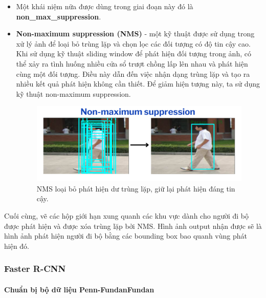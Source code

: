     \begin{itemize}[noitemsep, topsep=0pt, leftmargin=1.5em, label={$-$}]
        \item Một khái niệm nữa được dùng trong giai đoạn này đó là \textbf{non\_max\_suppression}. 
        \item \textbf{Non-maximum suppression (NMS)} - một kỹ thuật được sử dụng trong xử lý ảnh để loại bỏ trùng lặp và chọn lọc các đối tượng có độ tin cậy cao. Khi sử dụng kỹ thuật sliding window để phát hiện đối tượng trong ảnh, có thể xảy ra tình huống nhiều cửa sổ trượt chồng lấp lên nhau và phát hiện cùng một đối tượng. Điều này dẫn đến việc nhận dạng trùng lặp và tạo ra nhiều kết quả phát hiện không cần thiết. Để giảm hiện tượng này, ta sử dụng kỹ thuật non-maximum suppression.
        \graphicspath{{figures/}}
            \begin{figure}[h!]
            \centering
            \includegraphics[scale=0.35]{graphics/NMS.png}
            \caption{NMS loại bỏ phát hiện dư trùng lặp, giữ lại phát hiện đáng tin cậy.}
        \end{figure}
    \end{itemize}
Cuối cùng, vẽ các hộp giới hạn xung quanh các khu vực dành cho người đi bộ được phát hiện và được xóa trùng lặp bởi NMS. Hình ảnh output nhận được sẽ là hình ảnh phát hiện người đi bộ bằng các bounding box bao quanh vùng phát hiện đó.

\subsubsection{Faster R-CNN}
\paragraph{Chuẩn bị bộ dữ liệu Penn-FundanFundan\\}


